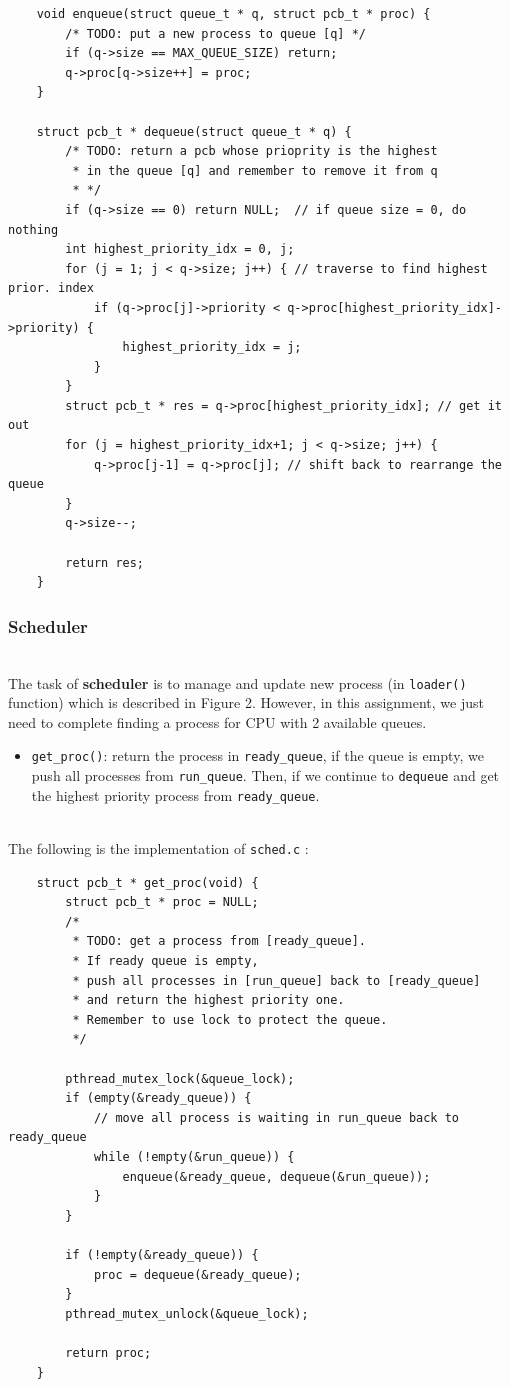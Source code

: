 \documentclass[a4paper]{article}
\begin{document}
	\begin{lstlisting}
    void enqueue(struct queue_t * q, struct pcb_t * proc) {
    	/* TODO: put a new process to queue [q] */
    	if (q->size == MAX_QUEUE_SIZE) return;
    	q->proc[q->size++] = proc;
    }
    
    struct pcb_t * dequeue(struct queue_t * q) {
    	/* TODO: return a pcb whose prioprity is the highest
    	 * in the queue [q] and remember to remove it from q
    	 * */
    	if (q->size == 0) return NULL;  // if queue size = 0, do nothing
    	int highest_priority_idx = 0, j;
    	for (j = 1; j < q->size; j++) { // traverse to find highest prior. index
     		if (q->proc[j]->priority < q->proc[highest_priority_idx]->priority) {
    			highest_priority_idx = j;
    		}
    	}
    	struct pcb_t * res = q->proc[highest_priority_idx]; // get it out
    	for (j = highest_priority_idx+1; j < q->size; j++) {
    		q->proc[j-1] = q->proc[j]; // shift back to rearrange the queue
    	}
    	q->size--;
    
    	return res;
    }
	\end{lstlisting}
	\subsubsection{Scheduler}
	\hfill\\
	The task of \textbf{scheduler} is to manage and update new process (in \texttt{loader()} function) which is described in Figure 2. However, in this assignment, we just need to complete finding a process for CPU with 2 available queues.
	\begin{itemize}
	    \item \texttt{get\_proc()}: return the process in \texttt{ready\_queue}, if the queue is empty, we push all processes from \texttt{run\_queue}. Then, if we continue to \texttt{dequeue} and get the highest priority process from \texttt{ready\_queue}.
	\end{itemize}
	\hfill \\
	The following is the implementation of \texttt{sched.c} : \\
	
	\begin{lstlisting}
    struct pcb_t * get_proc(void) {
    	struct pcb_t * proc = NULL;
    	/* 
    	 * TODO: get a process from [ready_queue]. 
    	 * If ready queue is empty, 
    	 * push all processes in [run_queue] back to [ready_queue] 
    	 * and return the highest priority one.
    	 * Remember to use lock to protect the queue.
    	 */
    
    	pthread_mutex_lock(&queue_lock);
    	if (empty(&ready_queue)) {
    		// move all process is waiting in run_queue back to ready_queue
    		while (!empty(&run_queue)) {
    			enqueue(&ready_queue, dequeue(&run_queue));
    		}
    	}
    
    	if (!empty(&ready_queue)) {
    		proc = dequeue(&ready_queue);
    	}
    	pthread_mutex_unlock(&queue_lock);
    
    	return proc;
    }
	\end{lstlisting}
	\newpage 
\end{document}
